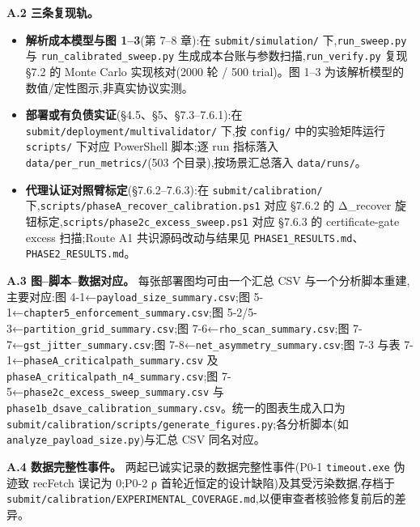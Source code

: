 \documentclass[UTF8,fontset=windows,a4paper,11pt]{ctexart}
\providecommand{\tightlist}{\setlength{\itemsep}{0pt}\setlength{\parskip}{0pt}}
\begin{document}
\textbf{A.2 三条复现轨。}

\begin{itemize}
\tightlist
\item
  \textbf{解析成本模型与图 1--3}(第 7--8 章):在
  \texttt{submit/simulation/} 下,\texttt{run\_sweep.py} 与
  \texttt{run\_calibrated\_sweep.py} 生成成本台账与参数扫描,\texttt{run\_verify.py}
  复现 §7.2 的 Monte Carlo 实现核对(2000 轮 / 500
  trial)。图 1--3 为该解析模型的数值/定性图示,非真实协议实测。
\item
  \textbf{部署或有负债实证}(§4.5、§5、§7.3--7.6.1):在
  \texttt{submit/deployment/multivalidator/} 下,按 \texttt{config/}
  中的实验矩阵运行 \texttt{scripts/} 下对应 PowerShell
  脚本;逐 run 指标落入 \texttt{data/per\_run\_metrics/}(503
  个目录),按场景汇总落入 \texttt{data/runs/}。
\item
  \textbf{代理认证对照臂标定}(§7.6.2--7.6.3):在
  \texttt{submit/calibration/} 下,\texttt{scripts/phaseA\_recover\_calibration.ps1}
  对应 §7.6.2 的 Δ\_recover 旋钮标定,\texttt{scripts/phase2c\_excess\_sweep.ps1}
  对应 §7.6.3 的 certificate-gate excess 扫描;Route A1 共识源码改动与结果见
  \texttt{PHASE1\_RESULTS.md}、\texttt{PHASE2\_RESULTS.md}。
\end{itemize}

\textbf{A.3 图--脚本--数据对应。}
每张部署图均可由一个汇总 CSV 与一个分析脚本重建,主要对应:图
4-1←\texttt{payload\_size\_summary.csv};图
5-1←\texttt{chapter5\_enforcement\_summary.csv};图
5-2/5-3←\texttt{partition\_grid\_summary.csv};图
7-6←\texttt{rho\_scan\_summary.csv};图
7-7←\texttt{gst\_jitter\_summary.csv};图
7-8←\texttt{net\_asymmetry\_summary.csv};图 7-3 与表
7-1←\texttt{phaseA\_criticalpath\_summary.csv} 及
\texttt{phaseA\_criticalpath\_n4\_summary.csv};图
7-5←\texttt{phase2c\_excess\_sweep\_summary.csv} 与
\texttt{phase1b\_dsave\_calibration\_summary.csv}。统一的图表生成入口为
\texttt{submit/calibration/scripts/generate\_figures.py};各分析脚本(如
\texttt{analyze\_payload\_size.py})与汇总 CSV 同名对应。

\textbf{A.4 数据完整性事件。} 两起已诚实记录的数据完整性事件(P0-1
\texttt{timeout.exe} 伪迹致 recFetch 误记为 0;P0-2 ρ
首轮近恒定的设计缺陷)及其受污染数据,存档于
\texttt{submit/calibration/EXPERIMENTAL\_COVERAGE.md},以便审查者核验修复前后的差异。
\end{document}

